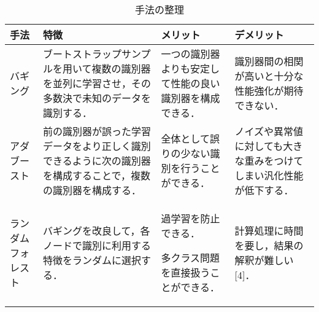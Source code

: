 \documentclass[dvipdfmx]{jreport}
\begin{document}
\begin{table}[h]
    \caption{手法の整理}\label{tab:4}
    \centering
    \renewcommand{\arraystretch}{1.5}
    \begin{tabular}{|>{\centering\arraybackslash}m{3cm}|>{\centering\arraybackslash}m{4cm}|>{\centering\arraybackslash}m{4cm}|>{\centering\arraybackslash}m{4cm}|}
        \hline
        \rowcolor{gray!30} %
        \textbf{手法} & \textbf{特徴} & \textbf{メリット} & \textbf{デメリット} \\
        \hline
        バギング&
        ブートストラップサンプルを用いて複数の識別器を並列に学習させ，その多数決で未知のデータを識別する．
        &
        一つの識別器よりも安定して性能の良い識別器を構成できる．
        &
        識別器間の相関が高いと十分な性能強化が期待できない．
        \\
        \hline
        アダブースト&
        前の識別器が誤った学習データをより正しく識別できるように次の識別器を構成することで，複数の識別器を構成する．
        &
        全体として誤りの少ない識別を行うことができる．
        &
        ノイズや異常値に対しても大きな重みをつけてしまい汎化性能が低下する．
        \\
        \hline
        ランダムフォレスト
        &
        バギングを改良して，各ノードで識別に利用する特徴をランダムに選択する．
        &
        過学習を防止できる．
        
        多クラス問題を直接扱うことができる．
        &
        計算処理に時間を要し，結果の解釈が難しい[4]．\\
        \hline
    \end{tabular}
\end{table}
\end{document}
